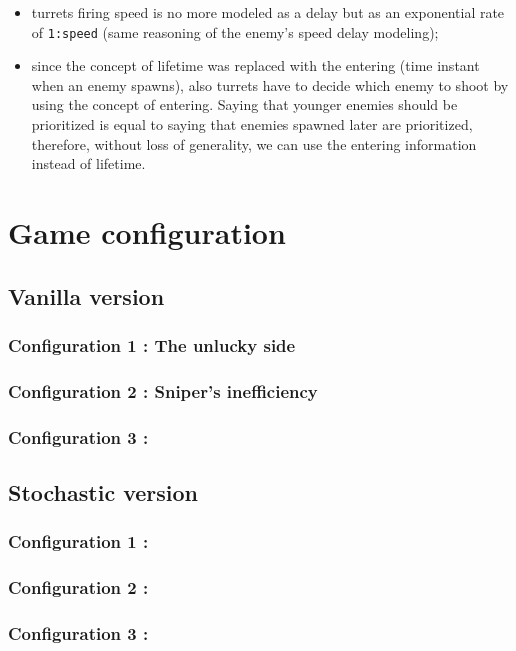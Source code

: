 \documentclass[
10pt, %
a4paper, %
oneside, %
headinclude,footinclude, %
BCOR5mm, %
]{scrartcl}
\begin{document}
\begin{itemize}
		\begin{itemize}
			\item turrets firing speed is no more modeled as a delay but as an exponential rate of \texttt{1:speed} (same reasoning of the enemy's speed delay modeling);
			\item since the concept of lifetime was replaced with the entering (time instant when an enemy spawns), also turrets have to decide which enemy to shoot by using the concept of entering. Saying that younger enemies should be prioritized is equal to saying that enemies spawned later are prioritized, therefore, without loss of generality, we can use the entering information instead of lifetime.
		\end{itemize}
\end{itemize}

\section{Game configuration}
\subsection{Vanilla version}
\subsubsection{Configuration 1 : The unlucky side}
\subsubsection{Configuration 2 : Sniper's inefficiency}
\subsubsection{Configuration 3 : }
\subsection{Stochastic version}
\subsubsection{Configuration 1 :}
\subsubsection{Configuration 2 :}
\subsubsection{Configuration 3 :}
\end{document}
